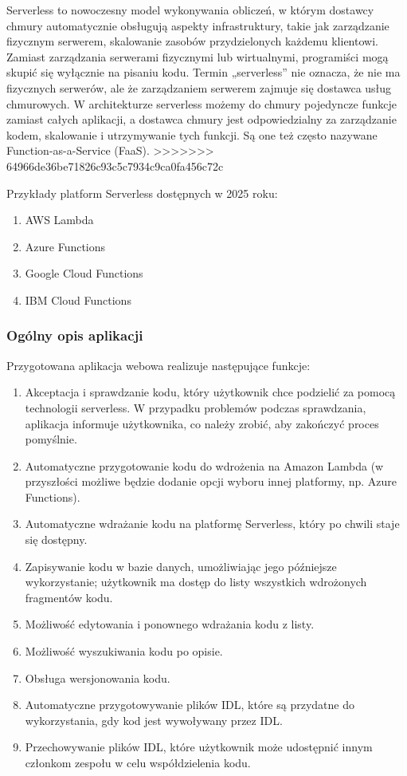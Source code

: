 \documentclass[runningheads,12pt]{llncs}
\begin{document}
Serverless to nowoczesny model wykonywania obliczeń, w którym dostawcy chmury automatycznie obsługują aspekty infrastruktury, takie jak zarządzanie fizycznym serwerem, skalowanie zasobów przydzielonych każdemu klientowi. Zamiast zarządzania serwerami fizycznymi lub wirtualnymi, programiści mogą skupić się wyłącznie na pisaniu kodu. Termin „serverless” nie oznacza, że nie ma fizycznych serwerów, ale że zarządzaniem serwerem zajmuje się dostawca usług chmurowych. W architekturze serverless możemy do chmury pojedyncze funkcje zamiast całych aplikacji, a dostawca chmury jest odpowiedzialny za zarządzanie kodem, skalowanie i utrzymywanie tych funkcji. Są one też często nazywane Function-as-a-Service (FaaS).
>>>>>>> 64966de36be71826c93c5c7934c9ca0fa456c72c

Przykłady platform Serverless dostępnych w 2025 roku:

\begin{enumerate}
    \item AWS Lambda
    \item Azure Functions
    \item Google Cloud Functions
    \item IBM Cloud Functions
\end{enumerate}

\subsubsection{Ogólny opis aplikacji}

Przygotowana aplikacja webowa realizuje następujące funkcje:

\begin{enumerate}
    \item Akceptacja i sprawdzanie kodu, który użytkownik chce podzielić za pomocą technologii serverless. W przypadku problemów podczas sprawdzania, aplikacja informuje użytkownika, co należy zrobić, aby zakończyć proces pomyślnie.
    \item Automatyczne przygotowanie kodu do wdrożenia na Amazon Lambda (w przyszłości możliwe będzie dodanie opcji wyboru innej platformy, np. Azure Functions).
    \item Automatyczne wdrażanie kodu na platformę Serverless, który po chwili staje się dostępny.
    \item Zapisywanie kodu w bazie danych, umożliwiając jego późniejsze wykorzystanie; użytkownik ma dostęp do listy wszystkich wdrożonych fragmentów kodu.
    \item Możliwość edytowania i ponownego wdrażania kodu z listy.
    \item Możliwość wyszukiwania kodu po opisie.
    \item Obsługa wersjonowania kodu.
    \item Automatyczne przygotowywanie plików IDL, które są przydatne do wykorzystania, gdy kod jest wywoływany przez IDL.
    \item Przechowywanie plików IDL, które użytkownik może udostępnić innym członkom zespołu w celu współdzielenia kodu.
\end{enumerate}
\end{document}
